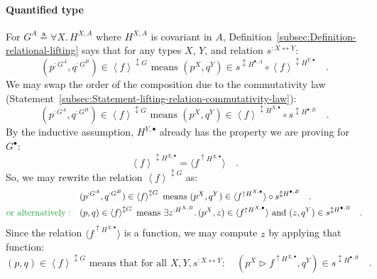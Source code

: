 \paragraph{Quantified type}

For $G^{A}\triangleq\forall X.\,H^{X,A}$ where $H^{X,A}$ is covariant
in $A$, Definition~\ref{subsec:Definition-relational-lifting} says
that for any types $X$, $Y$, and relation $s^{:X\leftrightarrow Y}$:
\[
(p^{:G^{A}},q^{:G^{B}})\in\left<f\right>^{\updownarrow G}\text{ means }(p^{X},q^{Y})\in s^{\updownarrow H^{\bullet,A}}\circ\left<f\right>^{\updownarrow H^{Y,\bullet}}\quad.
\]
We may swap the order of the composition due to the commutativity
law (Statement~\ref{subsec:Statement-lifting-relation-commutativity-law}):
\[
(p^{:G^{A}},q^{:G^{B}})\in\left<f\right>^{\updownarrow G}\text{ means }(p^{X},q^{Y})\in\left<f\right>^{\updownarrow H^{X,\bullet}}\circ s^{\updownarrow H^{\bullet,B}}\quad.
\]
By the inductive assumption, $H^{Y,\bullet}$ already has the property
we are proving for $G^{\bullet}$:
\[
\left<f\right>^{\updownarrow H^{X,\bullet}}=\langle f^{\uparrow H^{X,\bullet}}\rangle\quad.
\]
So, we may rewrite the relation $\left<f\right>^{\updownarrow G}$
as: 
\begin{align*}
 & (p^{:G^{A}},q^{:G^{B}})\in\left<f\right>^{\updownarrow G}\text{ means }(p^{X},q^{Y})\in\langle f^{\uparrow H^{X,\bullet}}\rangle\circ s^{\updownarrow H^{\bullet,B}}\quad.\\
{\color{greenunder}\text{or alternatively}:}\quad & (p,q)\in\left<f\right>^{\updownarrow G}\text{ means }\exists z^{:H^{X,B}}.\,(p^{X},z)\in\langle f^{\uparrow H^{X,\bullet}}\rangle\text{ and }(z,q^{Y})\in s^{\updownarrow H^{\bullet,B}}\quad.
\end{align*}
Since the relation $\langle f^{\uparrow H^{X,\bullet}}\rangle$ is
a function, we may compute $z$ by applying that function:
\begin{equation}
(p,q)\in\left<f\right>^{\updownarrow G}\text{ means that for all }X,Y,s^{:X\leftrightarrow Y}:\quad(p^{X}\triangleright f^{\uparrow H^{X,\bullet}},q^{Y})\in s^{\updownarrow H^{\bullet,B}}\quad.\label{eq:relational-universal-lifting-derivation1}
\end{equation}

